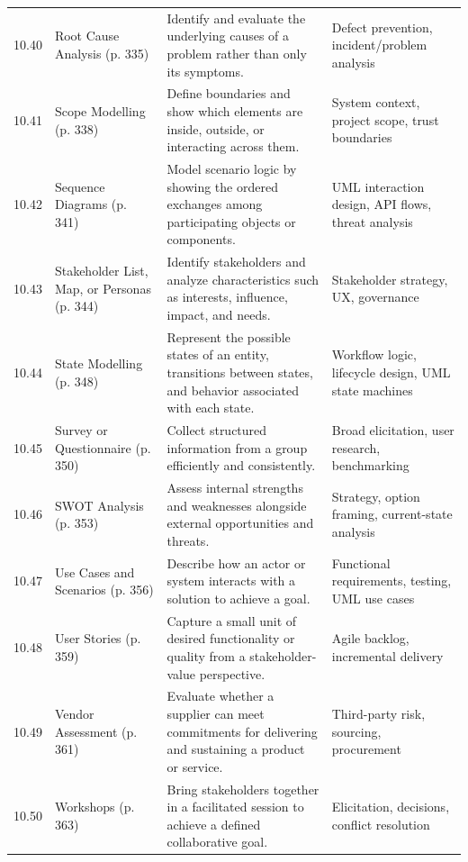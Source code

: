 \documentclass[11pt]{article}
\begin{document}
\begin{longtable}{@{}L{0.06\textwidth} L{0.24\textwidth} L{0.43\textwidth} L{0.18\textwidth}@{}}
10.40 & Root Cause Analysis \textcolor{BASlate}{\scriptsize (p. 335)} & Identify and evaluate the underlying causes of a problem rather than only its symptoms. & Defect prevention, incident/problem analysis\\
10.41 & Scope Modelling \textcolor{BASlate}{\scriptsize (p. 338)} & Define boundaries and show which elements are inside, outside, or interacting across them. & System context, project scope, trust boundaries\\
10.42 & Sequence Diagrams \textcolor{BASlate}{\scriptsize (p. 341)} & Model scenario logic by showing the ordered exchanges among participating objects or components. & UML interaction design, API flows, threat analysis\\
10.43 & Stakeholder List, Map, or Personas \textcolor{BASlate}{\scriptsize (p. 344)} & Identify stakeholders and analyze characteristics such as interests, influence, impact, and needs. & Stakeholder strategy, UX, governance\\
10.44 & State Modelling \textcolor{BASlate}{\scriptsize (p. 348)} & Represent the possible states of an entity, transitions between states, and behavior associated with each state. & Workflow logic, lifecycle design, UML state machines\\
10.45 & Survey or Questionnaire \textcolor{BASlate}{\scriptsize (p. 350)} & Collect structured information from a group efficiently and consistently. & Broad elicitation, user research, benchmarking\\
10.46 & SWOT Analysis \textcolor{BASlate}{\scriptsize (p. 353)} & Assess internal strengths and weaknesses alongside external opportunities and threats. & Strategy, option framing, current-state analysis\\
10.47 & Use Cases and Scenarios \textcolor{BASlate}{\scriptsize (p. 356)} & Describe how an actor or system interacts with a solution to achieve a goal. & Functional requirements, testing, UML use cases\\
10.48 & User Stories \textcolor{BASlate}{\scriptsize (p. 359)} & Capture a small unit of desired functionality or quality from a stakeholder-value perspective. & Agile backlog, incremental delivery\\
10.49 & Vendor Assessment \textcolor{BASlate}{\scriptsize (p. 361)} & Evaluate whether a supplier can meet commitments for delivering and sustaining a product or service. & Third-party risk, sourcing, procurement\\
10.50 & Workshops \textcolor{BASlate}{\scriptsize (p. 363)} & Bring stakeholders together in a facilitated session to achieve a defined collaborative goal. & Elicitation, decisions, conflict resolution\\
\bottomrule
\end{longtable}
\end{document}
